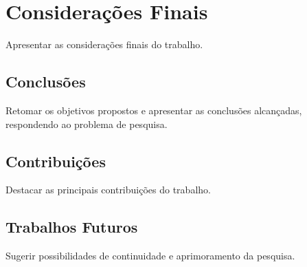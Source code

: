 \chapter{Considerações Finais}
\label{chap:conclusao}

Apresentar as considerações finais do trabalho.

\section{Conclusões}

Retomar os objetivos propostos e apresentar as conclusões alcançadas,
respondendo ao problema de pesquisa.

\section{Contribuições}

Destacar as principais contribuições do trabalho.

\section{Trabalhos Futuros}

Sugerir possibilidades de continuidade e aprimoramento da pesquisa.
